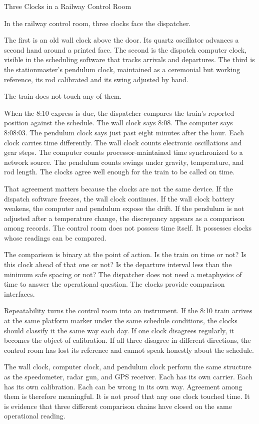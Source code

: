 \begin{coda}{Three Clocks in a Railway Control Room}

In the railway control room, three clocks face the dispatcher.

The first is an old wall clock above the door. Its quartz oscillator advances a
second hand around a printed face. The second is the dispatch computer clock,
visible in the scheduling software that tracks arrivals and departures. The
third is the stationmaster's pendulum clock, maintained as a ceremonial but
working reference, its rod calibrated and its swing adjusted by hand.

The train does not touch any of them.

When the 8:10 express is due, the dispatcher compares the train's reported
position against the schedule. The wall clock says 8:08. The computer says
8:08:03. The pendulum clock says just past eight minutes after the hour. Each
clock carries time differently. The wall clock counts electronic oscillations
and gear steps. The computer counts processor-maintained time synchronized to a
network source. The pendulum counts swings under gravity, temperature, and rod
length. The clocks agree well enough for the train to be called on time.

That agreement matters because the clocks are not the same device. If the
dispatch software freezes, the wall clock continues. If the wall clock battery
weakens, the computer and pendulum expose the drift. If the pendulum is not
adjusted after a temperature change, the discrepancy appears as a comparison
among records. The control room does not possess time itself. It possesses
clocks whose readings can be compared.

The comparison is binary at the point of action. Is the train on time or not?
Is this clock ahead of that one or not? Is the departure interval less than the
minimum safe spacing or not? The dispatcher does not need a metaphysics of time
to answer the operational question. The clocks provide comparison interfaces.

Repeatability turns the control room into an instrument. If the 8:10 train
arrives at the same platform marker under the same schedule conditions, the
clocks should classify it the same way each day. If one clock disagrees
regularly, it becomes the object of calibration. If all three disagree in
different directions, the control room has lost its reference and cannot speak
honestly about the schedule.

The wall clock, computer clock, and pendulum clock perform the same structure as
the speedometer, radar gun, and GPS receiver. Each has its own carrier. Each has
its own calibration. Each can be wrong in its own way. Agreement among them is
therefore meaningful. It is not proof that any one clock touched time. It is
evidence that three different comparison chains have closed on the same
operational reading.


\end{coda}
